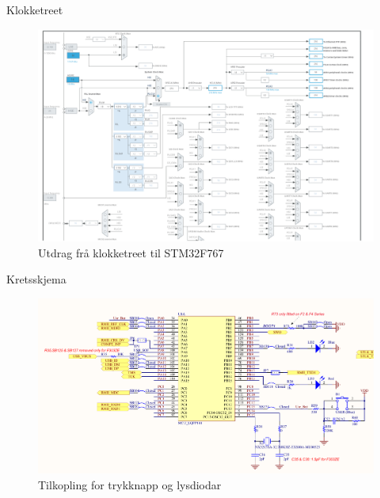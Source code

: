 \begin{frame}[containsverbatim]{Klokketreet}
	
\begin{figure}
	\centering
	\includegraphics[width=0.95\linewidth]{img/clock-tree}
	\caption{Utdrag frå klokketreet til STM32F767}
	\label{fig:clock-tree}
\end{figure}

	
\end{frame}

\begin{frame}{Kretsskjema}
	
\begin{figure}
	\centering
	\includegraphics[width=0.95\linewidth]{img/schematic-user-led-and-pb}
	\caption{Tilkopling for trykknapp og lysdiodar}
	\label{fig:schematic-user-led-and-pb}
\end{figure}

	
	
\end{frame}


